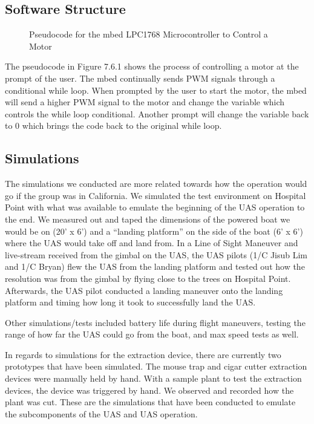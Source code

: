 \documentclass{wrcecapstone}
\begin{document}
\subsection{Software Structure}
\begin{figure}
\caption{Pseudocode for the mbed LPC1768 Microcontroller to Control a Motor}
\end{figure}

The pseudocode in Figure 7.6.1 shows the process of controlling a motor at the prompt of the user. The mbed continually sends PWM signals through a conditional while loop. When prompted by the user to start the motor, the mbed will send a higher PWM signal to the motor and change the variable which controls the while loop conditional. Another prompt will change the variable back to 0 which brings the code back to the original while loop.




\subsection{Simulations}

The simulations we conducted are more related towards how the operation would go if the group was in California. We simulated the test environment on Hospital Point with what was available to emulate the beginning of the UAS operation to the end. We measured out and taped the dimensions of the powered boat we would be on (20’ x 6’) and a “landing platform” on the side of the boat (6’ x 6’) where the UAS would take off and land from. 
In a Line of Sight Maneuver and live-stream received from the gimbal on the UAS, the UAS pilots (1/C Jisub Lim and 1/C Bryan) flew the UAS from the landing platform and tested out how the resolution was from the gimbal by flying close to the trees on Hospital Point. Afterwards, the UAS pilot conducted a landing maneuver onto the landing platform and timing how long it took to successfully land the UAS.

Other simulations/tests included battery life during flight maneuvers, testing the range of how far the UAS could go from the boat, and max speed tests as well. 

In regards to simulations for the extraction device, there are currently two prototypes that have been simulated. The mouse trap and cigar cutter extraction devices were manually held by hand. With a sample plant to test the extraction devices, the device was triggered by hand. We observed and recorded how the plant was cut. These are the simulations that have been conducted to emulate the subcomponents of the UAS and UAS operation. 
\end{document}

